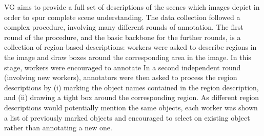 \documentclass[10pt, a4paper]{article}
\newcommand{\vg}{VG\xspace}
\begin{document}
\vg aims to provide a full set of descriptions of the scenes which images depict in order to spur complete scene understanding. 
The data collection followed a complex procedure, involving many different rounds of annotation. The first round of the procedure, and the basic backbone for the further rounds, is a collection of region-based descriptions: workers were asked to describe regions in the image and draw boxes around the corresponding area in the image. In this stage, workers were encouraged to annotate 
In a second independent round (involving new workers), annotators were then asked to process the region descriptions by (i) marking the object names contained in the region description, and (ii) drawing a tight box around the corresponding region. As different region descriptions would potentially mention the same objects, each worker was shown a list of previously marked objects and encouraged to select on existing object rather than annotating a new one.
\end{document}

